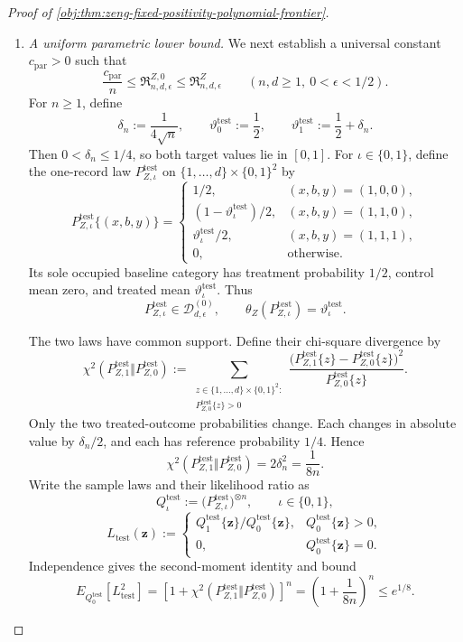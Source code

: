 \documentclass[11pt]{article}
\begin{document}
\begin{proof}[Proof of \cref{obj:thm:zeng-fixed-positivity-polynomial-frontier}]
\begin{enumerate}
\item \textit{A uniform parametric lower bound.}
We next establish a universal constant \(c_{\mathrm{par}}>0\) such that
\[
\frac{c_{\mathrm{par}}}{n}
\le
\mathfrak R^{Z,0}_{n,d,\epsilon}
\le
\mathfrak R^Z_{n,d,\epsilon}
\qquad
(n,d\ge1,\ 0<\epsilon<1/2).
\]
For \(n\ge1\), define
\[
\delta_n:=\frac1{4\sqrt n},
\qquad
\vartheta^{\mathrm{test}}_0:=\frac12,
\qquad
\vartheta^{\mathrm{test}}_1:=\frac12+\delta_n.
\]
Then \(0<\delta_n\le1/4\), so both target values lie in \([0,1]\).
For \(\iota\in\{0,1\}\), define the one-record law
\(P^{\mathrm{test}}_{Z,\iota}\) on
\(\{1,\ldots,d\}\times\{0,1\}^2\) by
\[
P^{\mathrm{test}}_{Z,\iota}\{(x,b,y)\}
=
\begin{cases}
1/2,&(x,b,y)=(1,0,0),\\
(1-\vartheta^{\mathrm{test}}_\iota)/2,
 &(x,b,y)=(1,1,0),\\
\vartheta^{\mathrm{test}}_\iota/2,
 &(x,b,y)=(1,1,1),\\
0,&\text{otherwise}.
\end{cases}
\]
Its sole occupied baseline category has treatment probability \(1/2\),
control mean zero, and treated mean \(\vartheta^{\mathrm{test}}_\iota\).
Thus
\[
P^{\mathrm{test}}_{Z,\iota}\in\mathcal D^{(0)}_{d,\epsilon},
\qquad
\theta_Z(P^{\mathrm{test}}_{Z,\iota})
=\vartheta^{\mathrm{test}}_\iota.
\]

The two laws have common support. Define their chi-square divergence by
\[
\chi^2\!\left(
P^{\mathrm{test}}_{Z,1}\Vert P^{\mathrm{test}}_{Z,0}
\right)
:=
\sum_{\substack{z\in\{1,\ldots,d\}\times\{0,1\}^2:\\
P^{\mathrm{test}}_{Z,0}\{z\}>0}}
\frac{
\bigl(P^{\mathrm{test}}_{Z,1}\{z\}
-P^{\mathrm{test}}_{Z,0}\{z\}\bigr)^2
}{
P^{\mathrm{test}}_{Z,0}\{z\}
}.
\]
Only the two treated-outcome probabilities change. Each changes in
absolute value by \(\delta_n/2\), and each has reference probability
\(1/4\). Hence
\[
\chi^2\!\left(
P^{\mathrm{test}}_{Z,1}\Vert P^{\mathrm{test}}_{Z,0}
\right)
=2\delta_n^2
=\frac1{8n}.
\]
Write the sample laws and their likelihood ratio as
\[
Q^{\mathrm{test}}_\iota
:=
\bigl(P^{\mathrm{test}}_{Z,\iota}\bigr)^{\otimes n},
\qquad \iota\in\{0,1\},
\]
\[
L_{\mathrm{test}}(\mathbf z)
:=
\begin{cases}
Q^{\mathrm{test}}_1\{\mathbf z\}/
Q^{\mathrm{test}}_0\{\mathbf z\},
 &Q^{\mathrm{test}}_0\{\mathbf z\}>0,\\
0,&Q^{\mathrm{test}}_0\{\mathbf z\}=0.
\end{cases}
\]
Independence gives the second-moment identity and bound
\[
E_{Q^{\mathrm{test}}_0}[L_{\mathrm{test}}^2]
=
\left[
1+\chi^2\!\left(
P^{\mathrm{test}}_{Z,1}\Vert P^{\mathrm{test}}_{Z,0}
\right)
\right]^n
=
\left(1+\frac1{8n}\right)^n
\le e^{1/8}.
\]


\end{enumerate}
\end{proof}
\end{document}
